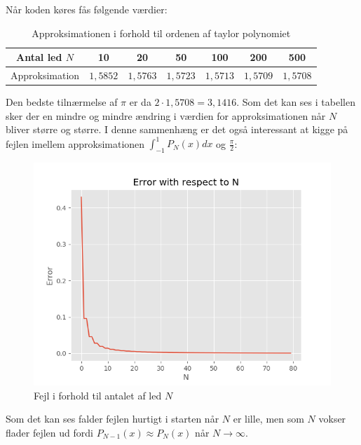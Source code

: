 Når koden køres fås følgende værdier:
\begin{table}[H]
  \begin{center}
    \begin{tabular}{ |c|c|c|c|c|c|c| }
      \hline
        Antal led $N$ & 10 & 20 & 50 & 100 & 200 & 500 \\
      \hline
        Approksimation & $1,5852$ & $1,5763$ & $1,5723$ & $1,5713$ & $1,5709$ & $1,5708$ \\
      \hline
    \end{tabular}
    \caption{Approksimationen i forhold til ordenen af taylor polynomiet}
  \end{center}
\end{table}
Den bedste tilnærmelse af $\pi$ er da $2\cdot 1,5708=3,1416$. Som det kan ses i tabellen sker der en mindre og mindre ændring i værdien for approksimationen når $N$ bliver større og større.
I denne sammenhæng er det også interessant at kigge på fejlen imellem approksimationen $\int_{-1}^1 P_N(x) dx$ og $\frac{\pi}{2}$:
\begin{figure}[H]
  \centering
  \includegraphics[width=\textwidth]{fig/img/ErrorWithRespectToN.png}
  \caption{Fejl i forhold til antalet af led $N$}
  \label{fig:FejlIForholdTilN}
\end{figure}
Som det kan ses falder fejlen hurtigt i starten når $N$ er lille, men som $N$ vokser flader fejlen ud fordi $P_{N-1}(x) \approx P_{N}(x)$ når $N \rightarrow \infty$.
